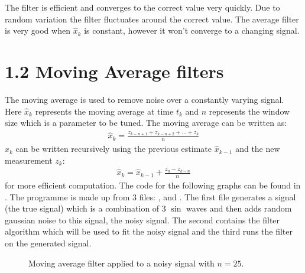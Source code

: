 \documentclass[letterpaper,10pt,english]{jupyterBook}
\begin{document}
\sphinxAtStartPar
The filter is efficient and converges to the correct value very quickly. Due to random variation the filter fluctuates around the correct value. The average filter is very good when \(\hat{x}_k\) is constant, however it won’t converge to a changing signal.


\section{1.2 Moving Average filters}
\label{\detokenize{1FilterBasics:moving-average-filters}}
\sphinxAtStartPar
The moving average is used to remove noise over a constantly varying signal. Here \(\hat{x}_k\) represents the moving average at time \(t_k\) and \(n\) represents the window size which is a parameter to be tuned. The moving average can be written as:
\begin{equation}\label{equation:1FilterBasics:eq-moving-average}
\begin{split}\hat{x}_k = \frac{z_{k-n+1} + z_{k-n+2}+...+z_k}{n}\end{split}
\end{equation}
\sphinxAtStartPar
\(\hat{x}_k\) can be written recursively using the previous estimate \(\hat{x}_{k-1}\) and the new measurement \(z_k\):
\begin{equation}\label{equation:1FilterBasics:eq-moving-average-rec}
\begin{split}\hat{x}_k = \hat{x}_{k-1} + \frac{z_n - z_{k-n}}{n} \end{split}
\end{equation}
\sphinxAtStartPar
for more efficient computation. The code for the following graphs can be found in . The programme is made up from 3 files: ,  and . The first file generates a signal (the true signal) which is a combination of 3 \(\sin\) waves and then adds random gaussian noise to this signal, the noisy signal. The second contains the filter algorithm which will be used to fit the noisy signal and the third runs the filter on the generated signal.

\begin{figure}[htbp]
\centering
\capstart

\noindent{}
\caption{Moving average filter applied to a noisy signal with \(n = 25\).}\label{\detokenize{1FilterBasics:fig-moving-average-k25}}\end{figure}
\end{document}
